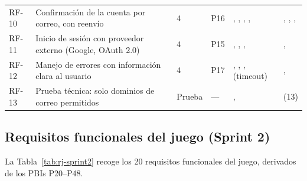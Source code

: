 \begin{longtable}{@{}L{0.7cm} L{2.3cm} L{0.9cm} L{0.6cm} L{6.6cm} L{2.2cm}@{}}
RF-10 & Confirmación de la cuenta por correo, con reenvío & 4 & P16 & , , , ,  & , , ,  \\
RF-11 & Inicio de sesión con proveedor externo (Google, OAuth 2.0) \cite{rfc6749} & 4 & P15 & , , ,  & ,  \\
RF-12 & Manejo de errores con información clara al usuario & 4 & P17 & , , ,  (timeout) & ,  \\
RF-13 & Prueba técnica: solo dominios de correo permitidos & Prueba & — & ,  &  (13) \\*
\bottomrule
\end{longtable}

\subsection{Requisitos funcionales del juego (Sprint 2)}
\label{sec:rj-sprint2}

La Tabla~\ref{tab:rj-sprint2} recoge los 20 requisitos funcionales del juego, derivados de los PBIs P20--P48.

